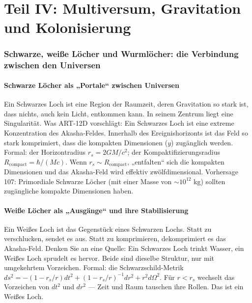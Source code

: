 \part*{Teil IV: Multiversum, Gravitation und Kolonisierung}

\section{Schwarze, weiße Löcher und Wurmlöcher: die Verbindung zwischen den Universen}
\subsection{Schwarze Löcher als „Portale`` zwischen Universen}
Ein Schwarzes Loch ist eine Region der Raumzeit, deren Gravitation so stark ist, dass nichts, auch kein Licht, entkommen kann. In seinem Zentrum liegt eine Singularität. Was ART-12D vorschlägt: Ein Schwarzes Loch ist eine extreme Konzentration des Akasha-Feldes. Innerhalb des Ereignishorizonts ist das Feld so stark komprimiert, dass die kompakten Dimensionen ($y$) zugänglich werden. Formal: der Horizontradius $r_s = 2GM/c^2$; der Kompaktifizierungsradius $R_{\text{compact}} = \hbar/(Mc)$. Wenn $r_s \sim R_{\text{compact}}$, „entfalten`` sich die kompakten Dimensionen und das Akasha-Feld wird effektiv zwölfdimensional. Vorhersage 107: Primordiale Schwarze Löcher (mit einer Masse von $\sim 10^{12}$ kg) sollten zugängliche kompakte Dimensionen haben.

\subsection{Weiße Löcher als „Ausgänge`` und ihre Stabilisierung}
Ein Weißes Loch ist das Gegenstück eines Schwarzen Lochs. Statt zu verschlucken, sendet es aus. Statt zu komprimieren, dekomprimiert es das Akasha-Feld. Denken Sie an eine Quelle: Ein Schwarzes Loch trinkt Wasser, ein Weißes Loch sprudelt es hervor. Beide sind dieselbe Struktur, nur mit umgekehrtem Vorzeichen. Formal: die Schwarzschild-Metrik $ds^2 = -(1-r_s/r)dt^2 + (1-r_s/r)^{-1}dr^2 + r^2 d\Omega^2$. Für $r < r_s$ wechselt das Vorzeichen von $dt^2$ und $dr^2$ --- Zeit und Raum tauschen ihre Rollen. Das ist ein Weißes Loch.

